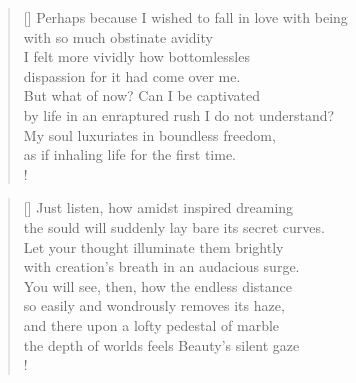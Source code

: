 \documentclass[]{article}
\begin{document}
\settowidth{\versewidth}{Perhaps because I wished to fall in love with being}
\begin{verse}[\versewidth]
Perhaps because I wished to fall in love with being\\
with so much obstinate avidity\\
I felt more vividly how bottomlessles\\
dispassion for it had come over me.\\
But what of now? Can I be captivated\\
by life in an enraptured rush I do not understand?\\
My soul luxuriates in boundless freedom,\\
as if inhaling life for the first time.\\!
\end{verse}
\bigskip \bigskip 

\settowidth{\versewidth}{Just listen, how amidst inspired dreaming    }
\begin{verse}[\versewidth]
Just listen, how amidst inspired dreaming\\
the sould will suddenly lay bare its secret curves.\\
Let your thought illuminate them brightly\\
with creation's breath in an audacious surge.\\
You will see, then, how the endless distance\\
so easily and wondrously removes its haze,\\
and there upon a lofty pedestal of marble\\
the depth of worlds feels Beauty's silent gaze\\!
\end{verse}
\bigskip \bigskip
\end{document}
